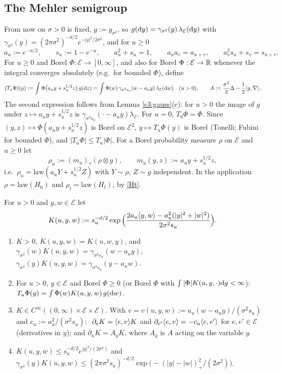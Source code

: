\subsection{The Mehler semigroup}\label{c3:ss:mehler}

From now on $\sigma>0$ is fixed, $g:=g_{\sigma^2}$, so $g(\mathrm{d} y)=\gamma_{\sigma^2}(y)\,\lambda_{\mathcal E}(\mathrm{d} y)$ with $\gamma_{\sigma^2}(y)=(2\pi\sigma^2)^{-d/2}e^{-|y|^2/2\sigma^2}$, and for $u\ge0$
\[
a_u:=e^{-u/2},\qquad s_u:=1-e^{-u},\qquad a_u^2+s_u=1,\qquad a_ua_v=a_{u+v},\qquad a_v^2s_u+s_v=s_{u+v}.
\]
For $u\ge0$ and Borel $\Phi:\mathcal E\to[0,\infty]$, and also for Borel $\Phi:\mathcal E\to\mathbb{R}$ whenever the integral converges absolutely (e.g.\ for bounded $\Phi$), define
\begin{equation}\label{Mehler}
(T_u\Phi)(y):=\int\Phi\big(a_uy+s_u^{1/2}z\big)\,g(\mathrm{d} z)=\int\Phi(w)\,\gamma_{\sigma^2s_u}(w-a_uy)\,\lambda_{\mathcal E}(\mathrm{d} w)\quad(u>0),
\qquad A:=\frac{\sigma^2}{2}\Delta-\frac12\langle y,\nabla\rangle .
\end{equation}
The second expression follows from Lemma \ref{c3:gauss}(c): for $u>0$ the image of $g$ under $z\mapsto a_uy+s_u^{1/2}z$ is $\gamma_{\sigma^2s_u}(\cdot-a_uy)\lambda_{\mathcal E}$. For $u=0$, $T_0\Phi=\Phi$.
Since $(y,z)\mapsto\Phi(a_uy+s_u^{1/2}z)$ is Borel on $\mathcal E^2$, $y\mapsto T_u\Phi(y)$ is Borel (Tonelli; Fubini for bounded $\Phi$), and $|T_u\Phi|\le T_u|\Phi|$.
For a Borel probability measure $\rho$ on $\mathcal E$ and $u\ge0$ let
\[
\rho_u:=(m_u)_*(\rho\otimes g),\qquad m_u(y,z):=a_uy+s_u^{1/2}z ,
\]
i.e.\ $\rho_u=\mathrm{law}(a_uY+s_u^{1/2}Z)$ with $Y\sim\rho$, $Z\sim g$ independent. In the application $\rho=\mathrm{law}(H_0)$ and $\rho_t=\mathrm{law}(H_t)$, by \eqref{Ht}.

\begin{auxlemma}\label{c3:kernel}
For $u>0$ and $y,w\in\mathcal E$ let
\begin{equation}\label{c3:K}
K(u,y,w):=s_u^{-d/2}\exp\Big(\frac{2a_u\langle y,w\rangle-a_u^2(|y|^2+|w|^2)}{2\sigma^2s_u}\Big).
\end{equation}
\begin{enumerate}[label=(\alph*),itemsep=1pt]
\item $K>0$, $K(u,y,w)=K(u,w,y)$, and $\gamma_{\sigma^2}(w)K(u,y,w)=\gamma_{\sigma^2s_u}(w-a_uy)$, $\gamma_{\sigma^2}(y)K(u,y,w)=\gamma_{\sigma^2s_u}(y-a_uw)$.
\item For $u>0$, $y\in\mathcal E$ and Borel $\Phi\ge0$ (or Borel $\Phi$ with $\int|\Phi|K(u,y,\cdot)\mathrm{d} g<\infty$): $T_u\Phi(y)=\int\Phi(w)K(u,y,w)\,g(\mathrm{d} w)$.
\item $K\in C^\infty((0,\infty)\times\mathcal E\times\mathcal E)$. With $v=v(u,y,w):=a_u(w-a_uy)/(\sigma^2s_u)$ and $c_u:=a_u^2/(\sigma^2s_u)$:
$\ \partial_eK=\langle e,v\rangle K$ and $\partial_{e'}\langle e,v\rangle=-c_u\langle e,e'\rangle$ for $e,e'\in\mathcal E$ (derivatives in $y$); and $\partial_uK=A_yK$, where $A_y$ is $A$ acting on the variable $y$.
\item $K(u,y,w)\le s_u^{-d/2}e^{|y|^2/(2\sigma^2)}$ and $\gamma_{\sigma^2}(y)K(u,y,w)\le(2\pi\sigma^2s_u)^{-d/2}\exp\big(-(|y|-|w|)_+^2/(2\sigma^2)\big)$.
\end{enumerate}
\end{auxlemma}

